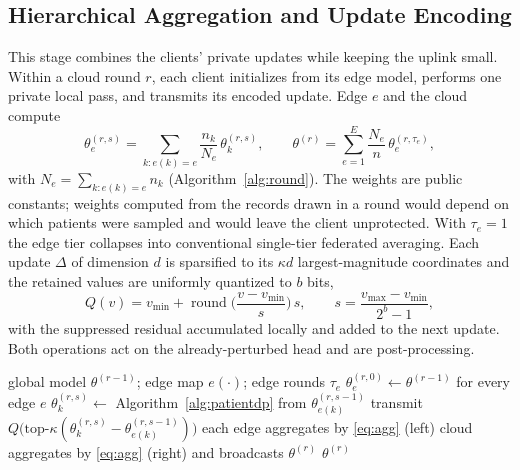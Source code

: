 \subsection{Hierarchical Aggregation and Update Encoding}
\label{sec:method:agg}
This stage combines the clients' private updates while keeping the uplink
small. Within a cloud round $r$, each client initializes from its edge model,
performs one private local pass, and transmits its encoded update. Edge $e$
and the cloud compute
\begin{equation}
\theta_e^{(r,s)} = \!\!\sum_{k:e(k)=e}\!\!\frac{n_k}{N_e}\,\theta_k^{(r,s)},
\qquad
\theta^{(r)} = \sum_{e=1}^{E}\frac{N_e}{n}\,\theta_e^{(r,\tau_e)},
\label{eq:agg}
\end{equation}
with $N_e = \sum_{k:e(k)=e} n_k$ (Algorithm~\ref{alg:round}). The weights
are public constants; weights
computed from the records drawn in a round would depend on which patients were
sampled and would leave the client unprotected. With $\tau_e = 1$ the edge
tier collapses into conventional single-tier federated averaging. Each update
$\Delta$ of dimension $d$ is sparsified to its $\kappa d$ largest-magnitude
coordinates and the retained values are uniformly quantized to $b$ bits,
\begin{equation}
Q(v) = v_{\min} + \operatorname{round}\!\Big(\frac{v - v_{\min}}{s}\Big)\, s,
\qquad s = \frac{v_{\max}-v_{\min}}{2^{b}-1},
\label{eq:quant}
\end{equation}
with the suppressed residual accumulated locally and added to the next
update. Both operations act on the already-perturbed head and are
post-processing.

\begin{algorithm}[!t]
\caption{PP-HFM cloud round $r$}
\label{alg:round}
\begin{algorithmic}[1]
\REQUIRE global model $\theta^{(r-1)}$; edge map $e(\cdot)$; edge rounds $\tau_e$
\STATE $\theta_e^{(r,0)} \leftarrow \theta^{(r-1)}$ for every edge $e$
    \STATE $\theta_k^{(r,s)} \leftarrow$ Algorithm~\ref{alg:patientdp}
           from $\theta_{e(k)}^{(r,s-1)}$
    \STATE transmit $Q\big(\text{top-}\kappa(\theta_k^{(r,s)}-\theta_{e(k)}^{(r,s-1)})\big)$
  \ENDFOR
  \STATE each edge aggregates by \eqref{eq:agg} (left)
\ENDFOR
\STATE cloud aggregates by \eqref{eq:agg} (right) and broadcasts $\theta^{(r)}$
\RETURN $\theta^{(r)}$
\end{algorithmic}
\end{algorithm}

